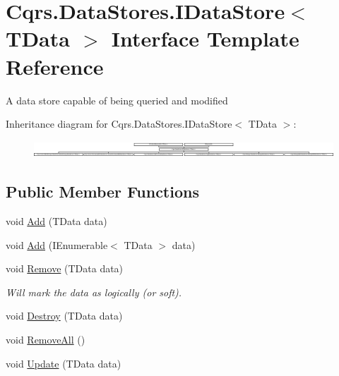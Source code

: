 \hypertarget{interfaceCqrs_1_1DataStores_1_1IDataStore}{}\section{Cqrs.\+Data\+Stores.\+I\+Data\+Store$<$ T\+Data $>$ Interface Template Reference}
\label{interfaceCqrs_1_1DataStores_1_1IDataStore}


A data store capable of being queried and modified  


Inheritance diagram for Cqrs.\+Data\+Stores.\+I\+Data\+Store$<$ T\+Data $>$\+:\begin{figure}[H]
\begin{center}
\leavevmode
\includegraphics[height=0.623608cm]{interfaceCqrs_1_1DataStores_1_1IDataStore}
\end{center}
\end{figure}
\subsection*{Public Member Functions}
\begin{DoxyCompactItemize}
\item 
void \hyperlink{interfaceCqrs_1_1DataStores_1_1IDataStore_a114404daaf37fec9cc5547cd9a17858c_a114404daaf37fec9cc5547cd9a17858c}{Add} (T\+Data data)
\item 
void \hyperlink{interfaceCqrs_1_1DataStores_1_1IDataStore_a906f3f2f80db7a549a4170eca4653e26_a906f3f2f80db7a549a4170eca4653e26}{Add} (I\+Enumerable$<$ T\+Data $>$ data)
\item 
void \hyperlink{interfaceCqrs_1_1DataStores_1_1IDataStore_a7ef540796bbe4257296841590bc23478_a7ef540796bbe4257296841590bc23478}{Remove} (T\+Data data)
\begin{DoxyCompactList}\small\item\em Will mark the {\itshape data}  as logically (or soft). \end{DoxyCompactList}\item 
void \hyperlink{interfaceCqrs_1_1DataStores_1_1IDataStore_aa7ade96f2f3151d5353cf7bdbb2baec5_aa7ade96f2f3151d5353cf7bdbb2baec5}{Destroy} (T\+Data data)
\item 
void \hyperlink{interfaceCqrs_1_1DataStores_1_1IDataStore_aead8d7a39a717d29af05daf7b64bea94_aead8d7a39a717d29af05daf7b64bea94}{Remove\+All} ()
\item 
void \hyperlink{interfaceCqrs_1_1DataStores_1_1IDataStore_a6d5d4dd572de8db01ff0c48d37faefa7_a6d5d4dd572de8db01ff0c48d37faefa7}{Update} (T\+Data data)
\end{DoxyCompactItemize}


